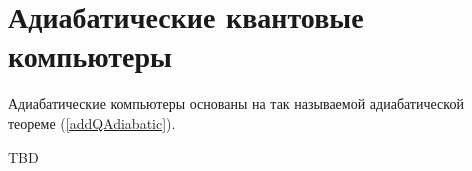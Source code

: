 \section{Адиабатические квантовые компьютеры}

Адиабатические компьютеры основаны на так называемой адиабатической
теореме (\ref {addQAdiabatic}).

TBD
